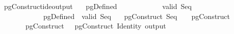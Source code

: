 \isamarkupfalse%
\ pgConstruct{\isacharunderscore}ide{\isacharunderscore}output{\isacharcolon}\isanewline
\ \ \ {\isachardoublequoteopen}pgDefined\ \isanewline
\ \ \ \ \ \ \ \ \ \ \ {\isachardoublequoteopen}valid\ {\isacharparenleft}Seq\ \isanewline
\ \ \ \ \ \ \ \ \ \ \ {\isachardoublequoteopen}{\isasymAnd}\ {\isasymlbrakk}pgDefined\ \ valid\ {\isacharparenleft}Seq\ \ \isanewline
{}\ pgConstruct\ {\isacharparenleft}Seq\ \ \ {\isasymapprox}\ pgConstruct\ \isanewline
\ \ \ \ \ \ \ {\isachardoublequoteopen}pgConstruct\ \ {\isasymapprox}\ pgConstruct\ {\isacharparenleft}Identity\ {\isacharparenleft}output\ 
